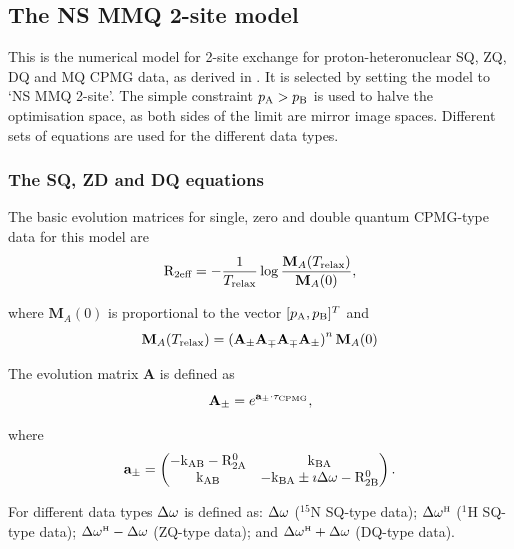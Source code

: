 
\subsection{The NS MMQ 2-site model}
\label{sect: dispersion: NS MMQ 2-site model}

This is the numerical model for 2-site exchange for proton-heteronuclear SQ, ZQ, DQ and MQ CPMG data, as derived in \citep{Korzhnev04a,Korzhnev04b,Korzhnev05b}.
It is selected by setting the model to `NS MMQ 2-site'.
The simple constraint $p_\textrm{A} > p_\textrm{B}$ is used to halve the optimisation space, as both sides of the limit are mirror image spaces.
Different sets of equations are used for the different data types.


\subsubsection{The SQ, ZD and DQ equations}

The basic evolution matrices for single, zero and double quantum CPMG-type data for this model are
\begin{equation}
    \mathrm{R}_\textrm{2eff} = - \frac{1}{T_\textrm{relax}} \log \frac{\mathbf{M}_A(T_\textrm{relax})}{\mathbf{M}_A(0)},
\end{equation}

where $\mathbf{M}_A(0)$ is proportional to the vector $[p_\textrm{A}, p_\textrm{B}]^T$ and
\begin{equation}
    \mathbf{M}_A(T_\textrm{relax}) = \left( \mathbf{A_\pm}\mathbf{A_\mp}\mathbf{A_\mp}\mathbf{A_\pm} \right)^n \mathbf{M}_A(0)
\end{equation}

The evolution matrix $\mathbf{A}$ is defined as
\begin{equation}
    \mathbf{A_\pm} = e^{\mathbf{a_\pm} \cdot \tau_\textrm{CPMG}},
\end{equation}

where
\begin{equation}
    \mathbf{a_\pm} = \begin{pmatrix}
                       -\textrm{k}_\textrm{AB} -\mathrm{R}_\mathrm{2A}^0 & \textrm{k}_\textrm{BA} \\
                       \textrm{k}_\textrm{AB}  & -\textrm{k}_\textrm{BA} \pm\imath\Delta\omega - \mathrm{R}_\mathrm{2B}^0
                     \end{pmatrix}.
\end{equation}

For different data types $\Delta\omega$ is defined as:  $\Delta\omega$ ($^{15}$N SQ-type data);  $\Delta\omega^{\scriptscriptstyle\mathrm{H}}$ ($^1$H SQ-type data); $\Delta\omega^{\scriptscriptstyle\mathrm{H}} - \Delta\omega$ (ZQ-type data); and $\Delta\omega^{\scriptscriptstyle\mathrm{H}} + \Delta\omega$ (DQ-type data).



